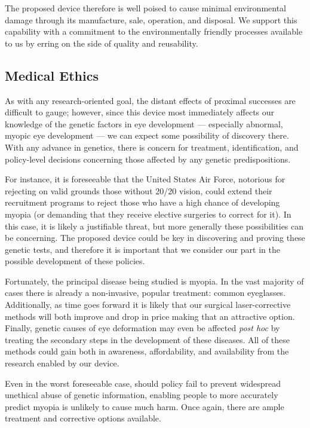 \documentclass{article}
\begin{document}
The proposed device therefore is well poised to cause minimal
environmental damage through its manufacture, sale, operation, and
disposal. We support this capability with a commitment to the
environmentally friendly processes available to us by erring on the
side of quality and reusability.


\subsection{Medical Ethics}
\label{sec:blah-blah-blah}

As with any research-oriented goal, the distant effects of proximal
successes are difficult to gauge; however, since this device most
immediately affects our knowledge of the genetic factors in eye
development --- especially abnormal, myopic eye development --- we can
expect some possibility of discovery there. With any advance in
genetics, there is concern for treatment, identification, and
policy-level decisions concerning those affected by any genetic
predispositions.

For instance, it is foreseeable that the United States Air Force, notorious for
rejecting on valid grounds those without 20/20 vision, could extend
their recruitment programs to reject those who have a high chance of
developing myopia (or demanding that they receive elective surgeries
to correct for it). In this case, it is likely a justifiable threat,
but more generally these possibilities can be concerning. The proposed
device could be key in discovering and proving these genetic tests,
and therefore it is important that we consider our part in the
possible development of these policies.

Fortunately, the principal disease being studied is myopia. In the
vast majority of cases there is already a non-invasive, popular
treatment: common eyeglasses. Additionally, as time goes forward it is
likely that our surgical laser-corrective methods will both improve
and drop in price making that an attractive option. Finally, genetic
causes of eye deformation may even be affected \textit{post hoc} by
treating the secondary steps in the development of these diseases. All
of these methods could gain both in awareness, affordability, and
availability from the research enabled by our device.

Even in the worst foreseeable case, should policy fail to prevent
widespread unethical abuse of genetic information, enabling people to
more accurately predict myopia is unlikely to cause much harm. Once
again, there are ample treatment and corrective options available.
\end{document}
